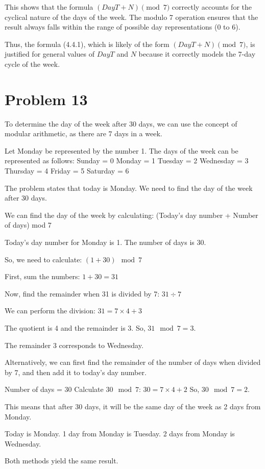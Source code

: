 \documentclass{article}
\begin{document}
This shows that the formula $(DayT + N) \pmod{7}$ correctly accounts for the cyclical nature of the days of the week. The modulo 7 operation ensures that the result always falls within the range of possible day representations (0 to 6).

Thus, the formula (4.4.1), which is likely of the form $(DayT + N) \pmod{7}$, is justified for general values of $DayT$ and $N$ because it correctly models the 7-day cycle of the week.

\newpage

\section*{Problem 13}
To determine the day of the week after 30 days, we can use the concept of modular arithmetic, as there are 7 days in a week.

Let Monday be represented by the number 1.
The days of the week can be represented as follows:
Sunday = 0
Monday = 1
Tuesday = 2
Wednesday = 3
Thursday = 4
Friday = 5
Saturday = 6

The problem states that today is Monday. We need to find the day of the week after 30 days.

We can find the day of the week by calculating:
(Today's day number + Number of days) mod 7

Today's day number for Monday is 1.
The number of days is 30.

So, we need to calculate:
$(1 + 30) \mod 7$

First, sum the numbers:
$1 + 30 = 31$

Now, find the remainder when 31 is divided by 7:
$31 \div 7$

We can perform the division:
$31 = 7 \times 4 + 3$

The quotient is 4 and the remainder is 3.
So, $31 \mod 7 = 3$.

The remainder 3 corresponds to Wednesday.

Alternatively, we can first find the remainder of the number of days when divided by 7, and then add it to today's day number.

Number of days = 30
Calculate $30 \mod 7$:
$30 = 7 \times 4 + 2$
So, $30 \mod 7 = 2$.

This means that after 30 days, it will be the same day of the week as 2 days from Monday.

Today is Monday.
1 day from Monday is Tuesday.
2 days from Monday is Wednesday.

Both methods yield the same result.
\end{document}

